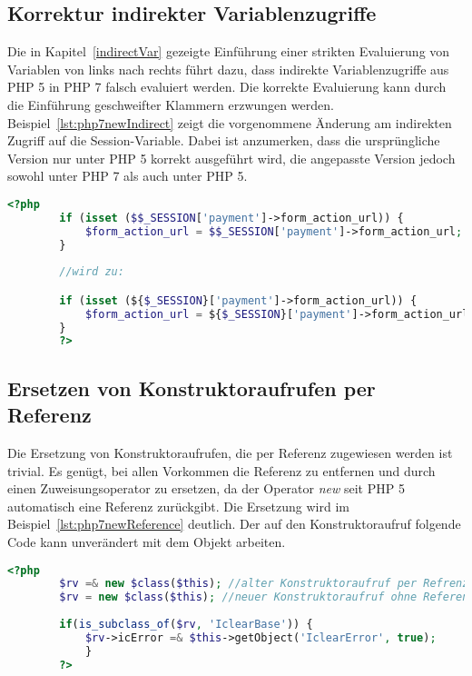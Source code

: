     \subsection{Korrektur indirekter Variablenzugriffe}\label{indirect}
    Die in Kapitel~\ref{indirectVar} gezeigte Einführung einer strikten Evaluierung von Variablen von links nach rechts führt dazu, 
    dass indirekte Variablenzugriffe aus \acs{PHP} 5 in \acs{PHP} 7 falsch evaluiert werden. Die korrekte Evaluierung kann durch 
    die Einführung geschweifter Klammern erzwungen werden. Beispiel~\ref{lst:php7newIndirect} zeigt die vorgenommene Änderung am 
    indirekten Zugriff auf die Session-Variable. Dabei ist anzumerken, dass die ursprüngliche Version nur unter \acs{PHP} 5 
    korrekt ausgeführt wird, die angepasste Version jedoch sowohl unter \acs{PHP} 7 als auch unter \acs{PHP} 5. 
    \begin{lstlisting}[language=php, caption={Anpassung indirekter Variablenzugriffe}, label={lst:php7newIndirect}]
        <?php
        if (isset ($$_SESSION['payment']->form_action_url)) {
            $form_action_url = $$_SESSION['payment']->form_action_url;
        }
        
        //wird zu:

        if (isset (${$_SESSION}['payment']->form_action_url)) {
            $form_action_url = ${$_SESSION}['payment']->form_action_url;
        }       
        ?>
    \end{lstlisting}
    
    \subsection{Ersetzen von Konstruktoraufrufen per Referenz}
    Die Ersetzung von Konstruktoraufrufen, die per Referenz zugewiesen werden ist trivial. Es genügt, bei allen Vorkommen die Referenz zu 
    entfernen und durch einen Zuweisungsoperator zu ersetzen, da der Operator \textit{new} seit \ac{PHP} 5 automatisch eine Referenz zurückgibt. 
    Die Ersetzung wird im Beispiel~\ref{lst:php7newReference} deutlich. Der auf den Konstruktoraufruf folgende Code kann unverändert mit dem Objekt arbeiten.
    
    \begin{lstlisting}[language=php, caption={Beispiel der Ersetzung von Konstruktoraufrufen per Referenz}, label={lst:php7newReference}]
        <?php
        $rv =& new $class($this); //alter Konstruktoraufruf per Refrenz
        $rv = new $class($this); //neuer Konstruktoraufruf ohne Referenz
        
        if(is_subclass_of($rv, 'IclearBase')) {
            $rv->icError =& $this->getObject('IclearError', true);
            }
        ?>
    \end{lstlisting}
    
